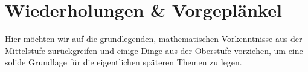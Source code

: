 \chapter{Wiederholungen \& Vorgeplänkel}
	Hier möchten wir auf die grundlegenden, mathematischen Vorkenntnisse aus der
	Mittelstufe zurückgreifen und einige Dinge aus der Oberstufe vorziehen, um eine
	solide Grundlage für die eigentlichen späteren Themen zu legen.

	

	

	

	

	

	

	

	

	

	
